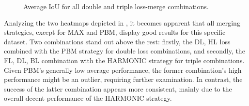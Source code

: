 \begin{figure}[H]%
  \centering
  \caption[Overall performance of triple combinations]{Average \ac{IoU} for all double and triple loss-merge combinations.}
  \label{overall_double_triple_melanoma}
\end{figure}
Analyzing the two heatmaps depicted in , it becomes apparent that all merging strategies, except for MAX and PBM, display good results for this specific dataset. Two combinations stand out above the rest: firstly, the DL, HL loss combined with the PBM strategy for double loss combinations, and secondly, the FL, DL, BL combination with the HARMONIC strategy for triple combinations. Given PBM's generally low average performance, the former combination's high performance might be an outlier, requiring further examination. In contrast, the success of the latter combination appears more consistent, mainly due to the overall decent performance of the HARMONIC strategy.

